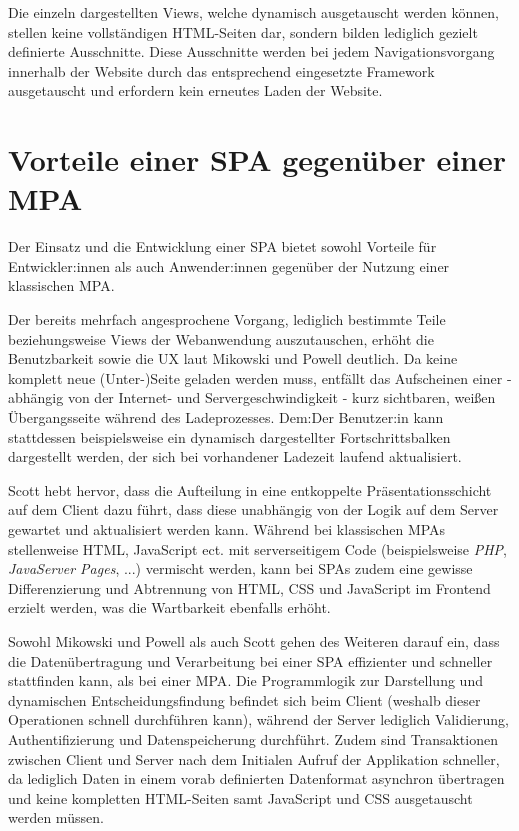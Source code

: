 \documentclass[a4paper,12pt,twoside]{scrreprt}
\begin{document}
\medskip

Die einzeln dargestellten Views, welche dynamisch ausgetauscht werden können, stellen keine vollständigen HTML-Seiten dar, sondern bilden lediglich gezielt definierte Ausschnitte. Diese Ausschnitte werden bei jedem Navigationsvorgang innerhalb der Website durch das entsprechend eingesetzte Framework ausgetauscht und erfordern kein erneutes Laden der Website. \parencite[][Seite 10f.]{scott_spa_2015}

\section{Vorteile einer \acs{SPA} gegenüber einer \acs{MPA}}
\label{sec:vorteile-spa-mpa}
Der Einsatz und die Entwicklung einer \acl{SPA} bietet sowohl Vorteile für Entwickler:innen als auch Anwender:innen gegenüber der Nutzung einer klassischen \acl{MPA}.

Der bereits mehrfach angesprochene Vorgang, lediglich bestimmte Teile beziehungsweise Views der Webanwendung auszutauschen, erhöht die Benutzbarkeit sowie die \ac{UX} laut Mikowski und Powell deutlich. Da keine komplett neue (Unter-)Seite geladen werden muss, entfällt das Aufscheinen einer - abhängig von der Internet- und Servergeschwindigkeit - kurz sichtbaren, weißen Übergangsseite während des Ladeprozesses. Dem:Der Benutzer:in kann stattdessen beispielsweise ein dynamisch dargestellter Fortschrittsbalken dargestellt werden, der sich bei vorhandener Ladezeit laufend aktualisiert. \parencite[][Seite 20]{mikowski_single_2013}

Scott hebt hervor, dass die Aufteilung in eine entkoppelte Präsentationsschicht auf dem Client dazu führt, dass diese unabhängig von der Logik auf dem Server gewartet und aktualisiert werden kann. Während bei klassischen \acsp{MPA} stellenweise HTML, JavaScript ect. mit serverseitigem Code (beispielsweise \textit{PHP}, \textit{JavaServer Pages}, ...) vermischt werden, kann bei \acsp{SPA} zudem eine gewisse Differenzierung und Abtrennung von HTML, CSS und JavaScript im Frontend erzielt werden, was die Wartbarkeit ebenfalls erhöht. \parencite[][Seite 13]{scott_spa_2015}

\newpage

Sowohl Mikowski und Powell als auch Scott gehen des Weiteren darauf ein, dass die Datenübertragung und Verarbeitung bei einer \acl{SPA} effizienter und schneller stattfinden kann, als bei einer \acl{MPA}. Die Programmlogik zur Darstellung und dynamischen Entscheidungsfindung befindet sich beim Client (weshalb dieser Operationen schnell durchführen kann), während der Server lediglich Validierung, Authentifizierung und Datenspeicherung durchführt. \parencite[][Seite 20]{mikowski_single_2013} Zudem sind Transaktionen zwischen Client und Server nach dem Initialen Aufruf der Applikation schneller, da lediglich Daten in einem vorab definierten Datenformat asynchron übertragen und keine kompletten HTML-Seiten samt JavaScript und CSS ausgetauscht werden müssen. \parencite[][Seite 13]{scott_spa_2015}
\end{document}
